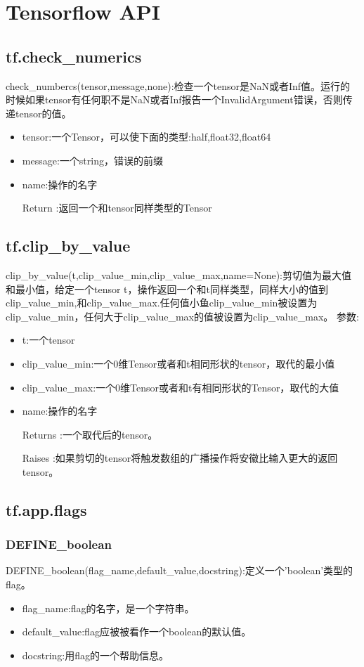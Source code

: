 \chapter{Tensorflow API}
\section{tf.check\_numerics}
check\_numbercs(tensor,message,none):检查一个tensor是NaN或者Inf值。运行的时候如果tensor有任何职不是NaN或者Inf报告一个InvalidArgument错误，否则传递tensor的值。
\begin{itemize}
	\item tensor:一个Tensor，可以使下面的类型:half,float32,float64
	\item message:一个string，错误的前缀
	\item name:操作的名字
	\item[Return]:返回一个和tensor同样类型的Tensor
\end{itemize}
\section{tf.clip\_by\_value}
clip\_by\_value(t,clip\_value\_min,clip\_value\_max,name=None):剪切值为最大值和最小值，给定一个tensor t，操作返回一个和t同样类型，同样大小的值到clip\_value\_min,和clip\_value\_max.任何值小鱼clip\_value\_min被设置为clip\_value\_min，任何大于clip\_value\_max的值被设置为clip\_value\_max。
参数:
\begin{itemize}
	\item t:一个tensor
	\item clip\_value\_min:一个0维Tensor或者和t相同形状的tensor，取代的最小值
	\item clip\_value\_max:一个0维Tensor或者和t有相同形状的Tensor，取代的大值
	\item name:操作的名字
	\item[Returns]:一个取代后的tensor。
	\item[Raises]:如果剪切的tensor将触发数组的广播操作将安徽比输入更大的返回tensor。
\end{itemize}
\section{tf.app.flags}
\subsection{DEFINE\_boolean}
DEFINE\_boolean(flag\_name,default\_value,docstring):定义一个'boolean'类型的flag。
\begin{itemize}
\item flag\_name:flag的名字，是一个字符串。
\item default\_value:flag应被被看作一个boolean的默认值。
\item docstring:用flag的一个帮助信息。
\end{itemize}

